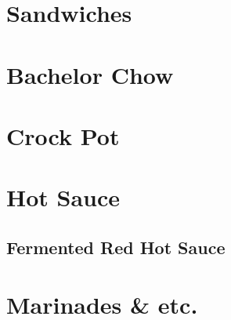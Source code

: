 \documentclass{family_cookbook}
\begin{document}
\chapter{Sandwiches}
\minitoc
\clearpage



\chapter{Bachelor Chow}
\minitoc
\clearpage




\chapter{Crock Pot}
\minitoc
\clearpage



\chapter{Hot Sauce}
\minitoc
\clearpage
{

	\section[Red Hot Sauce]{Fermented Red Hot Sauce}
	\let\section\subsection
	\let\subsection\subsubsection
	
	
}

\chapter{Marinades \& etc.}
\minitoc
\clearpage




\end{document}
